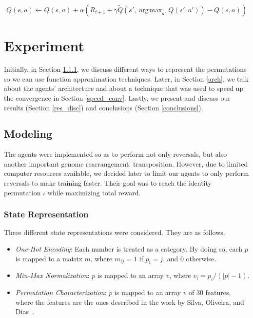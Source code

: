 \documentclass[11pt,twoside]{article}
\DeclareMathOperator*{\argmax}{\arg\!\max}
\begin{document}
\begin{equation}\label{double_equation}
	Q(s, a) \leftarrow Q(s, a) + \alpha (R_{t+1} + \gamma \widetilde{Q}(s', \argmax_{a'}{Q(s', a')}) - Q(s,a))
\end{equation}

\section{Experiment}\label{section:expr}

Initially, in Section \ref{state_rep}, we discuss different ways to represent the permutations so we can use function approximation techniques. Later, in Section \ref{arch}, we talk about the agents' architecture and about a technique that was used to speed up the convergence in Section \ref{speed_conv}. Lastly, we present and discuss our results (Section \ref{res_disc}) and conclusions (Section \ref{conclusions}).

\subsection{Modeling}

The agents were implemented so as to perform not only reversals, but also another important genome rearrangement: transposition. However, due to limited computer resources available, we decided later to limit our agents to only perform reversals to make training faster. Their goal was to reach the identity permutation $\iota$ while maximizing total reward. 

\subsubsection{State Representation}\label{state_rep}

Three different state representations were considered. They are as follows.

\begin{itemize}
	\item \textit{One-Hot Encoding}: Each number is treated as a category. By doing so, each $p$ is mapped to a matrix $m$, where $m_{ij} = 1$ if $p_i = j$, and $0$ otherwise. 
	\item \textit{Min-Max Normalization}: $p$ is mapped to an array $v$, where $v_i = p_i / (|p| - 1)$.
	\item \textit{Permutation Characterization}: $p$ is mapped to an array $v$ of $30$ features, where the features are the ones described in the work by Silva, Oliveira, and Dias~\cite{flavio}.
\end{itemize}
\end{document}
